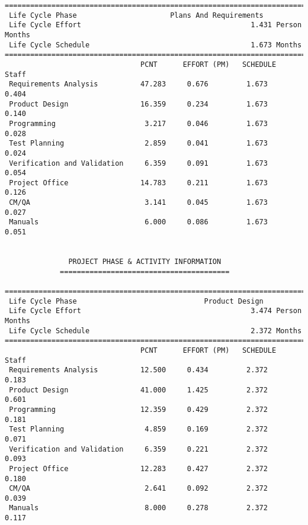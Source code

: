 \documentclass[11pt,a4paper,spanish,twoside]{report}
\begin{document}
{\begin{verbatim}
==============================================================================
 Life Cycle Phase                      Plans And Requirements
 Life Cycle Effort                                        1.431 Person Months
 Life Cycle Schedule                                      1.673 Months
==============================================================================
                                PCNT      EFFORT (PM)   SCHEDULE       Staff   
 Requirements Analysis          47.283     0.676         1.673        0.404
 Product Design                 16.359     0.234         1.673        0.140
 Programming                     3.217     0.046         1.673        0.028
 Test Planning                   2.859     0.041         1.673        0.024
 Verification and Validation     6.359     0.091         1.673        0.054
 Project Office                 14.783     0.211         1.673        0.126
 CM/QA                           3.141     0.045         1.673        0.027
 Manuals                         6.000     0.086         1.673        0.051


		       PROJECT PHASE & ACTIVITY INFORMATION
		     ========================================

==============================================================================
 Life Cycle Phase                              Product Design
 Life Cycle Effort                                        3.474 Person Months
 Life Cycle Schedule                                      2.372 Months
==============================================================================
                                PCNT      EFFORT (PM)   SCHEDULE       Staff   
 Requirements Analysis          12.500     0.434         2.372        0.183
 Product Design                 41.000     1.425         2.372        0.601
 Programming                    12.359     0.429         2.372        0.181
 Test Planning                   4.859     0.169         2.372        0.071
 Verification and Validation     6.359     0.221         2.372        0.093
 Project Office                 12.283     0.427         2.372        0.180
 CM/QA                           2.641     0.092         2.372        0.039
 Manuals                         8.000     0.278         2.372        0.117


\end{verbatim}}
\end{document}
